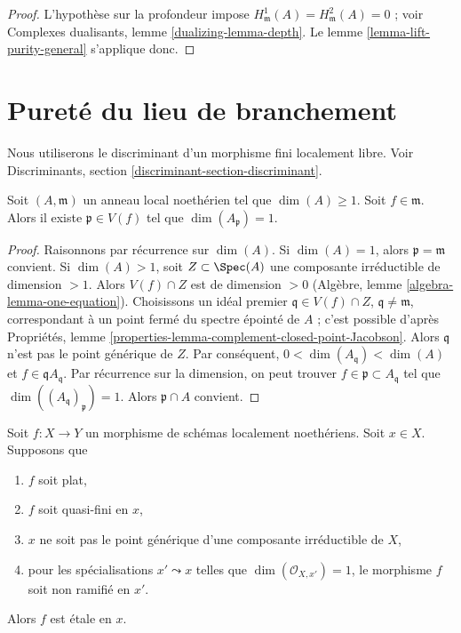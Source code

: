 \begin{proof}
L'hypothèse sur la profondeur impose
$H^1_\mathfrak m(A) = H^2_\mathfrak m(A) = 0$ ; voir
Complexes dualisants, lemme \ref{dualizing-lemma-depth}.
Le lemme \ref{lemma-lift-purity-general} s'applique donc.
\end{proof}










\section{Pureté du lieu de branchement}
\label{section-purity}

\noindent
Nous utiliserons le discriminant d'un morphisme fini localement libre. Voir
Discriminants, section \ref{discriminant-section-discriminant}.

\begin{lemma}
\label{lemma-find-point-codim-1}
Soit $(A, \mathfrak m)$ un anneau local noethérien tel que $\dim(A) \geq 1$.
Soit $f \in \mathfrak m$. Alors il existe $\mathfrak p \in V(f)$ tel que
$\dim(A_\mathfrak p) = 1$.
\end{lemma}

\begin{proof}
Raisonnons par récurrence sur $\dim(A)$. Si $\dim(A) = 1$, alors $\mathfrak p = \mathfrak m$
convient. Si $\dim(A) > 1$, soit $Z \subset \Spec(A)$ une composante irréductible
de dimension $> 1$. Alors $V(f) \cap Z$ est de dimension $> 0$
(Algèbre, lemme \ref{algebra-lemma-one-equation}). Choisissons un idéal premier
$\mathfrak q \in V(f) \cap Z$, $\mathfrak q \not = \mathfrak m$,
correspondant à un point fermé du spectre épointé de $A$ ;
c'est possible d'après
Propriétés, lemme \ref{properties-lemma-complement-closed-point-Jacobson}.
Alors $\mathfrak q$ n'est pas le point générique de $Z$. Par conséquent,
$0 < \dim(A_\mathfrak q) < \dim(A)$ et $f \in \mathfrak q A_\mathfrak q$.
Par récurrence sur la dimension, on peut trouver
$f \in \mathfrak p \subset A_\mathfrak q$ tel que
$\dim((A_\mathfrak q)_\mathfrak p) = 1$.
Alors $\mathfrak p \cap A$ convient.
\end{proof}

\begin{lemma}
\label{lemma-ramification-quasi-finite-flat}
Soit $f : X \to Y$ un morphisme de schémas localement noethériens.
Soit $x \in X$. Supposons que
\begin{enumerate}
\item $f$ soit plat,
\item $f$ soit quasi-fini en $x$,
\item $x$ ne soit pas le point générique d'une composante irréductible de $X$,
\item pour les spécialisations $x' \leadsto x$ telles que
$\dim(\mathcal{O}_{X, x'}) = 1$, le morphisme $f$ soit non ramifié en $x'$.
\end{enumerate}
Alors $f$ est étale en $x$.
\end{lemma}

